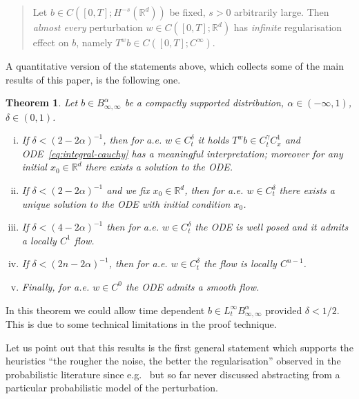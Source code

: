 \documentclass[10pt]{article}
\newcommand{\tmtextit}[1]{{\itshape{#1}}}
\newenvironment{enumerateroman}{\begin{enumerate}[i.] }{\end{enumerate}}
\newenvironment{quoteenv}{\begin{quote} }{\end{quote}}
\newtheorem{theorem}{Theorem}
\begin{document}
\begin{quoteenv}
  Let $b \in C ([0, T] ; H^{- s} (\mathbb{R}^d))$ be fixed, $s > 0$
  arbitrarily large. Then \tmtextit{almost every} perturbation $w \in C ([0,
  T] ; \mathbb{R}^d)$ has \tmtextit{infinite} regularisation effect on $b$,
  namely $T^w b \in C ([0, T] ; C^{\infty})$.
\end{quoteenv}

A quantitative version of the statements above, which collects some of the
main results of this paper, is the following one.

\begin{theorem}
  \label{intro_main_thm}Let $b \in B^{\alpha}_{\infty, \infty}$ be a compactly
  supported distribution, $\alpha \in (- \infty, 1)$, $\delta \in (0, 1)$.
  \begin{enumerateroman}
    \item If $\delta < (2 - 2 \alpha)^{- 1}$, then for a.e. $w \in
    C_t^{\delta}$ it holds $T^w b \in C^{\gamma}_t C^1_x$ and
    ODE~{\eqref{eq:integral-cauchy}} has a meaningful interpretation; moreover
    for any initial $x_0 \in \mathbb{R}^d$ there exists a solution to the ODE.
    
    \item If $\delta < (2 - 2 \alpha)^{- 1}$ and we fix $x_0 \in
    \mathbb{R}^d$, then for a.e. $w \in C_t^{\delta}$ there exists a unique
    solution to the ODE with initial condition $x_0$.
    
    \item If $\delta < (4 - 2 \alpha)^{- 1}$ then for a.e. $w \in
    C_t^{\delta}$ the ODE is well posed and it admits a locally $C^1$ flow.
    
    \item If $\delta < (2 n - 2 \alpha)^{- 1}$, then for a.e. $w \in
    C_t^{\delta}$ the flow is locally $C^{n - 1}$.
    
    \item Finally, for a.e. $w \in C^0$ the ODE admits a smooth flow.
  \end{enumerateroman}
\end{theorem}

\begin{remark}
  In this theorem we could allow time dependent $b \in L^{\infty}_t
  B^{\alpha}_{\infty, \infty}$ provided $\delta < 1 / 2$. This is due to some
  technical limitations in the proof technique.
\end{remark}

Let us point out that this results is the first general statement which
supports the heuristics ``the rougher the noise, the better the
regularisation'' observed in the probabilistic literature since
e.g.~{\cite{catelliergubinelli}} but so far never discussed abstracting from a
particular probabilistic model of the perturbation.
\end{document}
